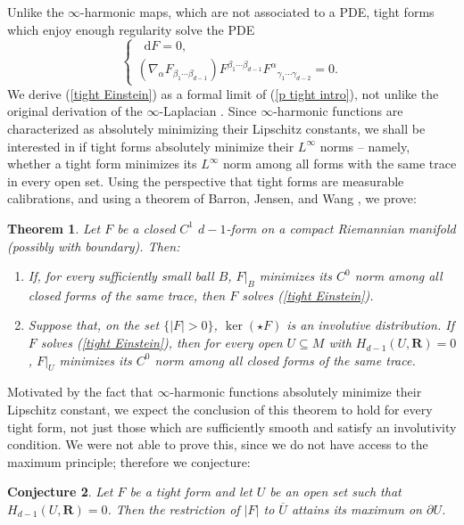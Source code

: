 \documentclass[reqno,11pt]{amsart}
\newcommand{\RR}{\mathbf{R}}
\newcommand*\dif{\mathop{}\!\mathrm{d}}
\newtheorem{theorem}{Theorem}[section]
\newtheorem{conjecture}[theorem]{Conjecture}
\theoremstyle{definition}
\numberwithin{equation}{section}
\begin{document}
Unlike the $\infty$-harmonic maps, which are not associated to a PDE, tight forms which enjoy enough regularity solve the PDE
\begin{equation}\label{tight Einstein}
\begin{cases}\dif F = 0, \\
	(\nabla_\alpha F_{\beta_1 \cdots \beta_{d - 1}}) F^{\beta_1 \cdots \beta_{d - 1}} {F^\alpha}_{\gamma_1 \cdots \gamma_{d - 2}} = 0.
\end{cases}
\end{equation}
We derive (\ref{tight Einstein}) as a formal limit of (\ref{p tight intro}), not unlike the original derivation of the $\infty$-Laplacian \cite{Aronsson67}.
Since $\infty$-harmonic functions are characterized as absolutely minimizing their Lipschitz constants, we shall be interested in if tight forms absolutely minimize their $L^\infty$ norms -- namely, whether a tight form minimizes its $L^\infty$ norm among all forms with the same trace in every open set.
Using the perspective that tight forms are measurable calibrations, and using a theorem of Barron, Jensen, and Wang \cite{Barron2001}, we prove:

\begin{theorem}\label{tight are absolute minimizers}
Let $F$ be a closed $C^1$ $d - 1$-form on a compact Riemannian manifold (possibly with boundary). Then:
\begin{enumerate}
\item If, for every sufficiently small ball $B$, $F|_B$ minimizes its $C^0$ norm among all closed forms of the same trace, then $F$ solves (\ref{tight Einstein}).
\item Suppose that, on the set $\{|F| > 0\}$, $\ker(\star F)$ is an involutive distribution.
If $F$ solves (\ref{tight Einstein}), then for every open $U \subseteq M$ with $H_{d - 1}(U, \RR) = 0$, $F|_U$ minimizes its $C^0$ norm among all closed forms of the same trace.
\end{enumerate}
\end{theorem}

Motivated by the fact that $\infty$-harmonic functions absolutely minimize their Lipschitz constant, we expect the conclusion of this theorem to hold for every tight form, not just those which are sufficiently smooth and satisfy an involutivity condition.
We were not able to prove this, since we do not have access to the maximum principle; therefore we conjecture:

\begin{conjecture}
Let $F$ be a tight form and let $U$ be an open set such that $H_{d - 1}(U, \RR) = 0$.
Then the restriction of $|F|$ to $\overline U$ attains its maximum on $\partial U$.
\end{conjecture}
\end{document}
